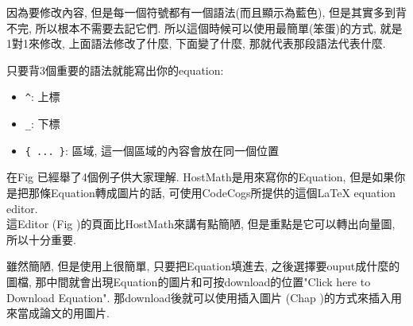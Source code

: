 
因為要修改內容, 但是每一個符號都有一個語法(而且顯示為藍色), 但是其實多到背不完, 所以根本不需要去記它們. 所以這個時候可以使用最簡單(笨蛋)的方式, 就是1對1來修改, 上面語法修改了什麼, 下面變了什麼, 那就代表那段語法代表什麼.

只要背3個重要的語法就能寫出你的equation:
  \begin{itemize}
    \item \verb|^|: 上標
    \item \verb|_|: 下標
    \item \verb|{ ... }|: 區域, 這一個區域的內容會放在同一個位置
  \end{itemize}

在Fig 已經舉了4個例子供大家理解.
\newpage
{}
HostMath是用來寫你的Equation, 但是如果你是把那條Equation轉成圖片的話, 可使用CodeCogs所提供的這個LaTeX equation editor.\\

這Editor (Fig )的頁面比HostMath來講有點簡陋, 但是重點是它可以轉出向量圖, 所以十分重要.


雖然簡陋, 但是使用上很簡單, 只要把Equation填進去, 之後選擇要ouput成什麼的圖檔, 那中間就會出現Equation的圖片和可按download的位置"Click here to Download Equation". 那download後就可以使用插入圖片 (Chap )的方式來插入用來當成論文的用圖片.
